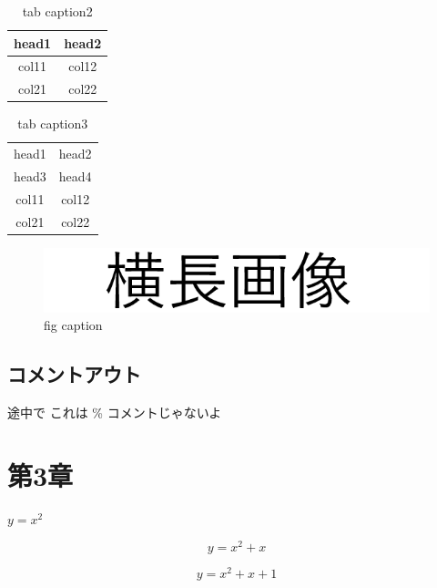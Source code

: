 \documentclass[a4paper,11pt]{jarticle}
\begin{document}
        \begin{table}[h]
            \caption{tab caption2}
            \begin{tabular}{cc} \toprule
                head1 & head2 \\\midrule
                col11 & col12 \\
                col21 & col22 \\\bottomrule
            \end{tabular}
            \label{tab:table2}
        \end{table}

        \begin{table}[h]
            \caption{tab caption3}
            \begin{tabular}{cc} \toprule head1 & head2 \\ head3 & head4 \\\hline col11 & col12 \\ col21 & col22 \\\bottomrule
            \end{tabular}
            \label{tab:table3}
        \end{table}

        \begin{figure}[h]
            \centering
            \includegraphics{zzz.png}
            \caption{fig caption}
            \label{fig:figure}
        \end{figure}

        \subsection*{コメントアウト}
            途中で %
            これは \% コメントじゃないよ

    \section{第3章}
        $y = x^2$

        $$y = x^2 + x$$

        \[y = x^2 + x + 1\]
\end{document}
